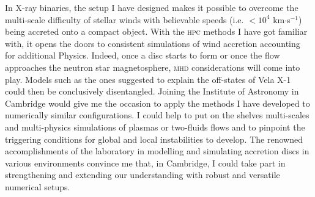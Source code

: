 \documentclass[a4paper,12pt,onecolumn]{article}
\begin{document}

\indent In X-ray binaries, the setup I have designed makes it possible to overcome the multi-scale difficulty of stellar winds with believable speeds (i.e. $<10^4$ km$\cdot$s$^{-1}$) being accreted onto a compact object. With the \textsc{hpc} methods I have got familiar with, it opens the doors to consistent simulations of wind accretion accounting for additional Physics. Indeed, once a disc starts to form or once the flow approaches the neutron star magnetosphere, \textsc{mhd} considerations will come into play. Models such as the ones suggested to explain the off-states of Vela X-1 could then be conclusively disentangled. Joining the Institute of Astronomy in Cambridge would give me the occasion to apply the methods I have developed to numerically similar configurations. I could help to put on the shelves multi-scales and multi-physics simulations of plasmas or two-fluids flows and to pinpoint the triggering conditions for global and local instabilities to develop. The renowned accomplishments of the laboratory in modelling and simulating accretion discs in various environments convince me that, in Cambridge, I could take part in strengthening and extending our understanding with robust and versatile numerical setups.

\newpage

\setlength{\bibsep}{5pt}
\small


\end{document}
